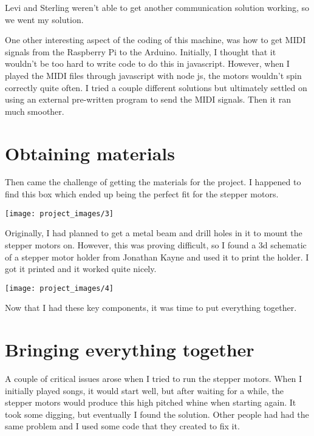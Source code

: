 \documentclass[12pt,letterpaper]{article}
\begin{document}
	Levi and Sterling weren't able to get another communication solution working, so we went my solution. 
	
	One other interesting aspect of the coding of this machine, was how to get MIDI signals from the Raspberry Pi to the Arduino. Initially, I thought that it wouldn't be too hard to write code to do this in javascript. However, when I played the MIDI files through javascript with node js, the motors wouldn't spin correctly quite often. I tried a couple different solutions but ultimately settled on using an external pre-written program to send the MIDI signals. Then it ran much smoother. 
	
	\section{Obtaining materials}
	
	Then came the challenge of getting the materials for the project. I happened to find this box which ended up being the perfect fit for the stepper motors. 
	
	\begin{center}
		\texttt{[image: project\_images/3]}
	\end{center}

	Originally, I had planned to get a metal beam and drill holes in it to mount the stepper motors on. However, this was proving difficult, so I found a 3d schematic of a stepper motor holder from Jonathan Kayne and used it to print the holder. I got it printed and it worked quite nicely. 
	
	\begin{center}
		\texttt{[image: project\_images/4]}
	\end{center}

	Now that I had these key components, it was time to put everything together. 
	
	\section{Bringing everything together}
	
	A couple of critical issues arose when I tried to run the stepper motors. When I initially played songs, it would start well, but after waiting for a while, the stepper motors would produce this high pitched whine when starting again. It took some digging, but eventually I found the solution. Other people had had the same problem and I used some code that they created to fix it. 
	
\end{document}
